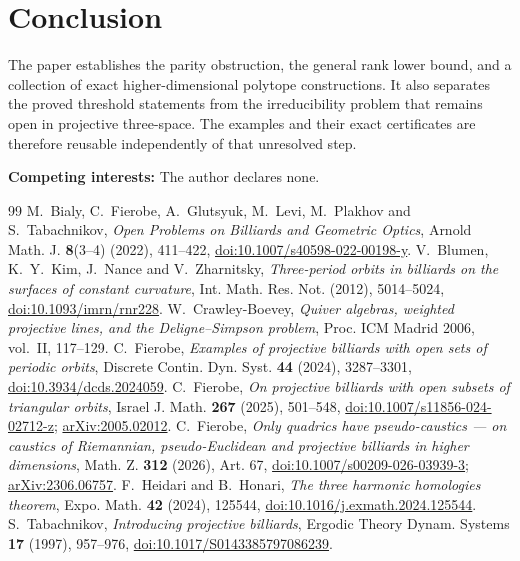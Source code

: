 \documentclass[11pt,a4paper]{article}
\theoremstyle{plain}
\theoremstyle{definition}
\theoremstyle{remark}
\begin{document}
\section*{Conclusion}
The paper establishes the parity obstruction, the general rank lower bound,
and a collection of exact higher-dimensional polytope constructions.  It also
separates the proved threshold statements from the irreducibility problem that
remains open in projective three-space.  The examples and their exact
certificates are therefore reusable independently of that unresolved step.
\par\medskip
\noindent\textbf{Competing interests:} The author declares none.
\par\medskip
\begin{thebibliography}{99}
 M.~Bialy, C.~Fierobe, A.~Glutsyuk, M.~Levi, M.~Plakhov and
S.~Tabachnikov, \emph{Open Problems on Billiards and Geometric Optics},
Arnold Math. J. \textbf{8}(3--4) (2022), 411--422,
\href{https://doi.org/10.1007/s40598-022-00198-y}{doi:10.1007/s40598-022-00198-y}.
 V.~Blumen, K.~Y.~Kim, J.~Nance and V.~Zharnitsky,
\emph{Three-period orbits in billiards on the surfaces of constant curvature},
Int. Math. Res. Not. (2012), 5014--5024,
\href{https://doi.org/10.1093/imrn/rnr228}{doi:10.1093/imrn/rnr228}.
 W.~Crawley-Boevey, \emph{Quiver algebras, weighted projective
lines, and the Deligne--Simpson problem}, Proc. ICM Madrid 2006, vol.~II,
117--129.
 C.~Fierobe, \emph{Examples of projective billiards with open
sets of periodic orbits}, Discrete Contin. Dyn. Syst. \textbf{44} (2024),
3287--3301, \href{https://doi.org/10.3934/dcds.2024059}{doi:10.3934/dcds.2024059}.
 C.~Fierobe, \emph{On projective billiards with open subsets
of triangular orbits}, Israel J. Math. \textbf{267} (2025), 501--548,
\href{https://doi.org/10.1007/s11856-024-02712-z}{doi:10.1007/s11856-024-02712-z};
\href{https://arxiv.org/abs/2005.02012}{arXiv:2005.02012}.
 C.~Fierobe, \emph{Only quadrics have pseudo-caustics ---
on caustics of Riemannian, pseudo-Euclidean and projective billiards in higher
dimensions}, Math. Z. \textbf{312} (2026), Art. 67,
\href{https://doi.org/10.1007/s00209-026-03939-3}{doi:10.1007/s00209-026-03939-3};
\href{https://arxiv.org/abs/2306.06757}{arXiv:2306.06757}.
 F.~Heidari and B.~Honari, \emph{The three harmonic
homologies theorem}, Expo. Math. \textbf{42} (2024), 125544,
\href{https://doi.org/10.1016/j.exmath.2024.125544}{doi:10.1016/j.exmath.2024.125544}.
 S.~Tabachnikov, \emph{Introducing projective billiards},
Ergodic Theory Dynam. Systems \textbf{17} (1997), 957--976,
\href{https://doi.org/10.1017/S0143385797086239}{doi:10.1017/S0143385797086239}.
\end{thebibliography}
\end{document}

